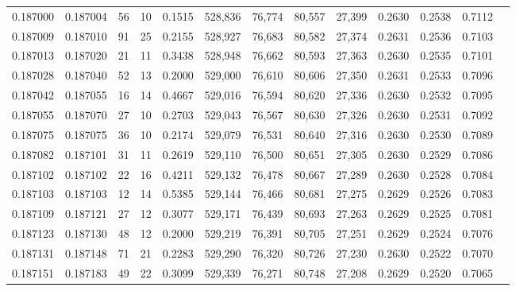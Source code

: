 \begin{tabular}{rrrrrrrrrrrrr}
0.187000 & 0.187004 &    56 &  10 &                                     0.1515 & 528,836 &  76,774 &  80,557 &  27,399 & 0.2630 & 0.2538 & 0.7112 \\
0.187009 & 0.187010 &    91 &  25 &                                     0.2155 & 528,927 &  76,683 &  80,582 &  27,374 & 0.2631 & 0.2536 & 0.7103 \\
0.187013 & 0.187020 &    21 &  11 &                                     0.3438 & 528,948 &  76,662 &  80,593 &  27,363 & 0.2630 & 0.2535 & 0.7101 \\
0.187028 & 0.187040 &    52 &  13 &                                     0.2000 & 529,000 &  76,610 &  80,606 &  27,350 & 0.2631 & 0.2533 & 0.7096 \\
0.187042 & 0.187055 &    16 &  14 &                                     0.4667 & 529,016 &  76,594 &  80,620 &  27,336 & 0.2630 & 0.2532 & 0.7095 \\
0.187055 & 0.187070 &    27 &  10 &                                     0.2703 & 529,043 &  76,567 &  80,630 &  27,326 & 0.2630 & 0.2531 & 0.7092 \\
0.187075 & 0.187075 &    36 &  10 &                                     0.2174 & 529,079 &  76,531 &  80,640 &  27,316 & 0.2630 & 0.2530 & 0.7089 \\
0.187082 & 0.187101 &    31 &  11 &                                     0.2619 & 529,110 &  76,500 &  80,651 &  27,305 & 0.2630 & 0.2529 & 0.7086 \\
0.187102 & 0.187102 &    22 &  16 &                                     0.4211 & 529,132 &  76,478 &  80,667 &  27,289 & 0.2630 & 0.2528 & 0.7084 \\
0.187103 & 0.187103 &    12 &  14 &                                     0.5385 & 529,144 &  76,466 &  80,681 &  27,275 & 0.2629 & 0.2526 & 0.7083 \\
0.187109 & 0.187121 &    27 &  12 &                                     0.3077 & 529,171 &  76,439 &  80,693 &  27,263 & 0.2629 & 0.2525 & 0.7081 \\
0.187123 & 0.187130 &    48 &  12 &                                     0.2000 & 529,219 &  76,391 &  80,705 &  27,251 & 0.2629 & 0.2524 & 0.7076 \\
0.187131 & 0.187148 &    71 &  21 &                                     0.2283 & 529,290 &  76,320 &  80,726 &  27,230 & 0.2630 & 0.2522 & 0.7070 \\
0.187151 & 0.187183 &    49 &  22 &                                     0.3099 & 529,339 &  76,271 &  80,748 &  27,208 & 0.2629 & 0.2520 & 0.7065 \\

\end{tabular}
